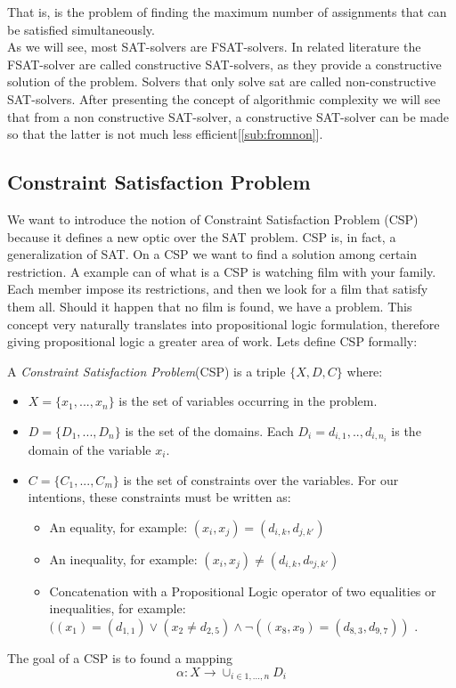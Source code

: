That is, is the problem of finding the maximum number of assignments that can be satisfied simultaneously.\\

As we will see, most SAT-solvers are FSAT-solvers. In related literature the FSAT-solver are called constructive SAT-solvers, as they provide a constructive solution of the problem. Solvers that only solve sat are called non-constructive SAT-solvers. After presenting the concept of algorithmic complexity we will see that from a non constructive SAT-solver, a constructive SAT-solver can be made so that the latter is not much less efficient[\ref{sub:fromnon}].

\subsection{Constraint Satisfaction Problem}

We want to introduce the notion of Constraint Satisfaction Problem (CSP) because it defines a new optic over the SAT problem. CSP is, in fact, a generalization of SAT. On a CSP we want to find a solution among certain restriction. A example can of what is a CSP is watching film with your family. Each member impose its restrictions, and then we look for a film that satisfy them all. Should it happen that no film is found, we have a problem. This concept very naturally translates into propositional logic formulation, therefore giving propositional logic a greater area of work. Lets define CSP formally:

\begin{definition}
  A \emph{Constraint Satisfaction Problem}(CSP) is a triple $\{X,D,C\}$ where:
  \begin{itemize}
  \item $X=\{x_1,...,x_n\}$ is the set of variables  occurring in the problem.
  \item $D=\{D_1,...,D_n\}$ is the set of the domains. Each $D_i={d_{i,1},..,d_{i,n_i}}$ is the domain of the variable $x_i$.
  \item $C=\{C_1,...,C_m\}$ is the set of constraints over the variables. For our intentions, these constraints must be written as:
    \begin{itemize}
    \item An equality, for example: $(x_i, x_j) = (d_{i,k}, d_{j,k'})$
    \item An inequality, for example: $(x_i, x_j) \ne (d_{i,k}, d_{ºj,k'})$
    \item Concatenation with a Propositional Logic operator of two equalities or inequalities, for example: $((x_1) = (d_{1,1}) \vee (x_2 \ne d_{2,5}) \wedge \neg((x_8,x_9) = (d_{8,3},d_{9,7}))$ .
    \end{itemize}
  \end{itemize}
\end{definition}
  The goal of a CSP is to found a mapping \[ \alpha:X\to \cup_{i\in 1,...,n} D_i\]
  
